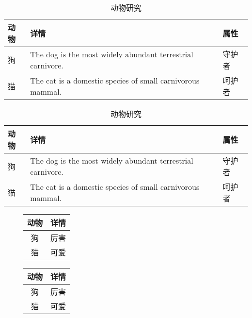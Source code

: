 \documentclass[a4paper, UTF-8,14pt]{ctexart}
\newcommand{\tcap}[1]{
	\caption{\zihao{5}\kaishu #1}
}
\begin{document}
\begin{table}[!h]
	\centering
	\tcap{动物研究} %
	\begin{tabularx}{0.8\textwidth}
		{
			|>{\centering\arraybackslash}X %
			|>{\raggedright\arraybackslash}X %
			|>{\raggedleft\arraybackslash}X| %
		}
		\hline
		动物 & 详情 & 属性 \\
		\hline
		狗    & The dog is the most widely abundant terrestrial carnivore. & 守护者\\
		\hline
		猫    & The cat is a domestic species of small carnivorous mammal. & 呵护者\\
		\hline
	\end{tabularx}
\end{table}

\begin{table}[!h]
	\centering
	\tcap{动物研究} %
	\begin{tabularx}{0.8\textwidth}
		{
			>{\raggedleft\arraybackslash}X %
			>{\centering\arraybackslash}X %
			>{\raggedright\arraybackslash}X %
		}
	\toprule
	动物 & 详情 & 属性 \\
	\midrule
	狗    & The dog is the most widely abundant terrestrial carnivore. & 守护者\\
	\addlinespace
	猫    & The cat is a domestic species of small carnivorous mammal. & 呵护者\\
	\bottomrule
	\end{tabularx}
\end{table}

\begin{figure}[htbp!]
	\centering
	\begin{minipage}[b]{.5\textwidth}
		\centering
		\label{tab:t2} %
		\begin{tabular}{cp{6cm}}
			\toprule
			动物 & 详情 \\
			\midrule
			狗    & 厉害 \\
			\addlinespace
			猫    & 可爱\\
			\bottomrule
		\end{tabular}
	\end{minipage}
	\qquad
	\begin{minipage}[b]{.3\textwidth}
		\centering
		
		\label{tab:t3} %
		\begin{tabular}{cp{3cm}}
			\toprule
			动物 & 详情 \\
			\midrule
			狗    & 厉害 \\
			\addlinespace
			猫    & 可爱\\
			\bottomrule
		\end{tabular}
	\end{minipage}
\end{figure}
\end{document}
